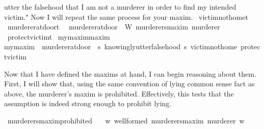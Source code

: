 \begin{isabellebody}
{utter the falsehood that I am not a murderer in order to find my intended victim." Now I will repeat
the same process for your maxim.%
}\isanewline
\isanewline
{}\isamarkupfalse%
\ victim{\isacharunderscore}not{\isacharunderscore}home{\isacharcolon}{\isacharcolon}t\isanewline
%
\isanewline
{}\isamarkupfalse%
\ murderer{\isacharunderscore}at{\isacharunderscore}door{\isacharcolon}{\isacharcolon}t\ \ \isanewline
{\isachardoublequoteopen}murderer{\isacharunderscore}at{\isacharunderscore}door\ {\isasymequiv}\ W\ murderers{\isacharunderscore}maxim\ murderer{\isachardoublequoteclose}\isanewline
%
\isanewline
{}\isamarkupfalse%
\ protect{\isacharunderscore}victim{\isacharcolon}{\isacharcolon}t\isanewline
%
\isanewline
{}\isamarkupfalse%
\ my{\isacharunderscore}maxim{\isacharcolon}{\isacharcolon}maxim\ \ \isanewline
{\isachardoublequoteopen}my{\isacharunderscore}maxim\ {\isasymequiv}\ {\isacharparenleft}murderer{\isacharunderscore}at{\isacharunderscore}door{\isacharcomma}\ \ {\isasymlambda}s{\isachardot}\ knowingly{\isacharunderscore}utter{\isacharunderscore}falsehood\ s\ victim{\isacharunderscore}not{\isacharunderscore}home{\isacharcomma}\ protect{\isacharunderscore}victim{\isacharparenright}{\isachardoublequoteclose}\isanewline
%
%
\begin{isamarkuptext}%
Now that I have defined the maxims at hand, I can begin reasoning about them. First, I will show 
that, using the same convention of lying common sense fact as above, the murderer's maxim is prohibited.
Effectively, this tests that the assumption is indeed strong enough to prohibit lying.%
\end{isamarkuptext}\isamarkuptrue%
\isamarkupfalse%
\ murderers{\isacharunderscore}maxim{\isacharunderscore}prohibited{\isacharcolon}\isanewline
\ \ \ {\isachardoublequoteopen}{\isasymforall}w{\isachardot}\ well{\isacharunderscore}formed\ murderers{\isacharunderscore}maxim\ murderer\ w{\isachardoublequoteclose}\isanewline

\end{isabellebody}
